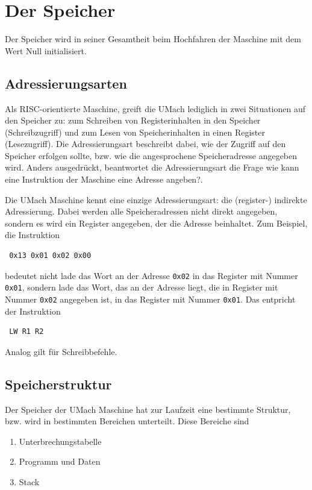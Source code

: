 \section{Der Speicher}
\label{sec:Speicher}

Der Speicher wird in seiner Gesamtheit beim Hochfahren der Maschine mit dem
Wert Null initialisiert.

\subsection{Adressierungsarten}
\label{subsec:Adressierungsarten}

Als RISC-orientierte Maschine, greift die UMach lediglich in zwei Situationen
auf den Speicher zu: zum Schreiben von Registerinhalten in den Speicher
(Schreibzugriff) und zum Lesen von Speicherinhalten in einen Register
(Lesezugriff).  Die \gls{Adressierungsart} beschreibt dabei, wie der Zugriff
auf den Speicher erfolgen sollte, bzw. wie die angesprochene Speicheradresse
angegeben wird. Anders ausgedrückt, beantwortet die Adressierungsart die Frage
\glqq wie kann eine Instruktion der Maschine eine Adresse angeben?\grqq. 

Die UMach Maschine kennt eine einzige Adressierungsart: die (register-)
indirekte Adressierung. Dabei werden alle Speicheradressen nicht direkt
angegeben, sondern es wird ein Register angegeben, der die Adresse beinhaltet.
Zum Beispiel, die Instruktion 
\begin{lstlisting}
 0x13 0x01 0x02 0x00
\end{lstlisting}
bedeutet nicht \glqq lade das Wort an der Adresse \texttt{0x02} in das Register
mit Nummer \texttt{0x01}\grqq, sondern \glqq lade das Wort, das an der Adresse
liegt, die in Register mit Nummer \texttt{0x02} angegeben ist, in das Register
mit Nummer \texttt{0x01}\grqq. Das entpricht der Instruktion
\begin{lstlisting}
 LW R1 R2
\end{lstlisting}
Analog gilt für Schreibbefehle.


\subsection{Speicherstruktur}

Der Speicher der UMach Maschine hat zur Laufzeit eine bestimmte Struktur, bzw.
wird in bestimmten Bereichen unterteilt. Diese Bereiche sind
\begin{enumerate}
 \item Unterbrechungstabelle
 \item Programm und Daten
 \item Stack
\end{enumerate}

